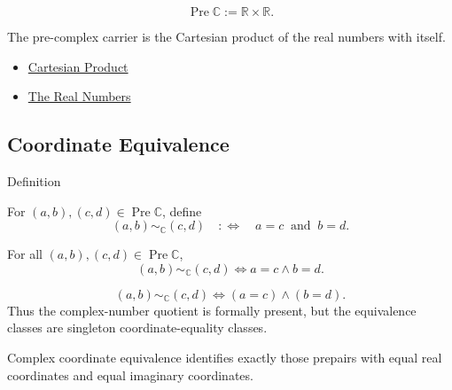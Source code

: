 \begin{remark*}
\[
\operatorname{Pre}\mathbb{C}:=\mathbb{R}\times\mathbb{R}.
\]
\end{remark*}

\begin{remark*}[Interpretation]
The pre-complex carrier is the Cartesian product of the real numbers with
itself.
\end{remark*}

\begin{dependencies}
\begin{itemize}
  \item \hyperref[def:cartesian-product-rel]{Cartesian Product}
  \item \hyperref[def:reals]{The Real Numbers}
\end{itemize}
\end{dependencies}

\subsection*{Coordinate Equivalence}

\begin{definitionbox}{Definition}
\begin{definition}
\label{def:complex-coordinate-equivalence}
For $(a,b),(c,d)\in\operatorname{Pre}\mathbb{C}$, define
\[
(a,b)\sim_{\mathbb{C}}(c,d)
\quad:\Longleftrightarrow\quad
a=c\ \text{ and }\ b=d.
\]
\end{definition}
\end{definitionbox}

\begin{remark*}
For all $(a,b),(c,d)\in\operatorname{Pre}\mathbb{C}$,
\[
(a,b)\sim_{\mathbb{C}}(c,d)
\Longleftrightarrow
a=c\land b=d.
\]
\end{remark*}

\begin{remark*}
\[
(a,b)\sim_{\mathbb{C}}(c,d)
\Longleftrightarrow
(a=c)\land(b=d).
\]
Thus the complex-number quotient is formally present, but the equivalence
classes are singleton coordinate-equality classes.
\end{remark*}

\begin{remark*}[Interpretation]
Complex coordinate equivalence identifies exactly those prepairs with equal
real coordinates and equal imaginary coordinates.
\end{remark*}

